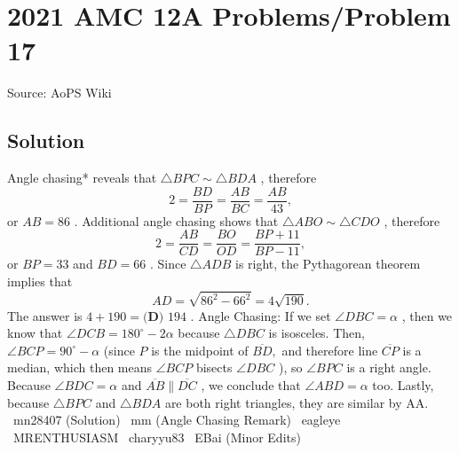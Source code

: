 \documentclass[12pt]{article}
\begin{document}
\section*{{2021 AMC 12A Problems/Problem 17}}
Source: AoPS Wiki

\subsection*{Solution}
Angle chasing* reveals that $\triangle BPC\sim\triangle BDA$ , therefore \[2=\frac{BD}{BP}=\frac{AB}{BC}=\frac{AB}{43},\] or $AB=86$ . Additional angle chasing shows that $\triangle ABO\sim\triangle CDO$ , therefore \[2=\frac{AB}{CD}=\frac{BO}{OD}=\frac{BP+11}{BP-11},\] or $BP=33$ and $BD=66$ . Since $\triangle ADB$ is right, the Pythagorean theorem implies that \[AD=\sqrt{86^2-66^2}=4\sqrt{190}.\] The answer is $4+190=\boxed{\textbf{(D) }194}$ . Angle Chasing: If we set $\angle DBC = \alpha$ , then we know that $\angle DCB = 180^\circ-2\alpha$ because $\triangle DBC$ is isosceles. Then, $\angle BCP = 90^\circ-\alpha$ (since $P$ is the midpoint of $\overline{BD},$ and therefore line $\overline{CP}$ is a median, which then means $\angle BCP$ bisects $\angle DBC$ ), so $\angle BPC$ is a right angle. Because $\angle BDC = \alpha$ and $\overline{AB}\parallel\overline{DC}$ , we conclude that $\angle ABD = \alpha$ too. Lastly, because $\triangle BPC$ and $\triangle BDA$ are both right triangles, they are similar by AA. ~mn28407 (Solution) ~mm (Angle Chasing Remark) ~eagleye ~MRENTHUSIASM ~charyyu83 ~EBai (Minor Edits)
\end{document}

